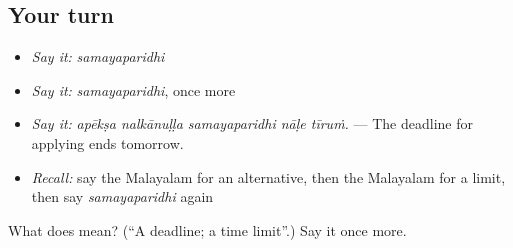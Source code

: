 \subsection*{Your turn}
\begin{itemize}
\raggedright
  \item \emph{Say it:} \emph{samayaparidhi}
  \item \emph{Say it:} \emph{samayaparidhi}, once more
  \item \emph{Say it:} \emph{apēkṣa nalkānuḷḷa samayaparidhi nāḷe tīruṁ.} — The deadline for applying ends tomorrow.
  \item \emph{Recall:} say the Malayalam for an alternative, then the Malayalam for a limit, then say \emph{samayaparidhi} again
\end{itemize}

\begin{tcolorbox}[breakable,colback=teal!4,colframe=teal!35!black,title={Before you move on}]
What does  mean? (\textquotedblleft{}A deadline; a time limit\textquotedblright{}.) Say it once more.
\end{tcolorbox}
